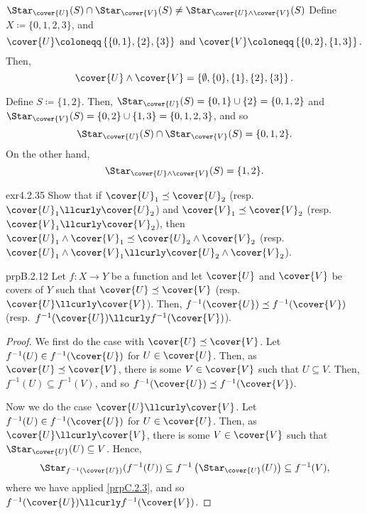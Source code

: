 \begin{exm}{$\Star _{\cover{U}}(S)\cap \Star _{\cover{V}}(S)\neq \Star _{\cover{U}\wedge \cover{V}}(S)$}{}
Define $X\coloneqq \{ 0,1,2,3\}$, and
\begin{equation*}
\cover{U}\coloneqq \left\{ \{ 0,1\} ,\{ 2\} ,\{ 3\} \right\} \text{ and }\cover{V}\coloneqq \left\{ \{ 0,2\} ,\{ 1,3\} \right\} .
\end{equation*}
Then,
\begin{equation}
\cover{U}\wedge \cover{V}=\left\{ \emptyset ,\{ 0\} ,\{ 1\} ,\{ 2\} ,\{ 3\} \right\} .
\end{equation}

Define $S\coloneqq \{ 1,2\}$.  Then, $\Star _{\cover{U}}(S)=\{ 0,1\} \cup \{ 2\} =\{ 0,1,2\}$ and $\Star _{\cover{V}}(S)=\{ 0,2\} \cup \{ 1,3\} =\{ 0,1,2,3\}$, and so
\begin{equation}
\Star _{\cover{U}}(S)\cap \Star _{\cover{V}}(S)=\{ 0,1,2\} .
\end{equation}
On the other hand,
\begin{equation}
\Star _{\cover{U}\wedge \cover{V}}(S)=\{ 1,2\} .
\end{equation}
\end{exm}
\begin{exr}{}{exr4.2.35}
Show that if $\cover{U}_1\preceq \cover{U}_2$ (resp.$\cover{U}_1\llcurly \cover{U}_2$) and $\cover{V}_1\preceq \cover{V}_2$ (resp.~$\cover{V}_1\llcurly \cover{V}_2$), then $\cover{U}_1\wedge \cover{V}_1\preceq \cover{U}_2\wedge \cover{V}_2$ (resp.~$\cover{U}_1\wedge \cover{V}_1\llcurly \cover{U}_2\wedge \cover{V}_2$).
\end{exr}
\begin{prp}{}{prpB.2.12}
Let $f\colon X\rightarrow Y$ be a function and let $\cover{U}$ and $\cover{V}$ be covers of $Y$ such that $\cover{U}\preceq \cover{V}$ (resp.~$\cover{U}\llcurly \cover{V}$).  Then, $f^{-1}(\cover{U})\preceq f^{-1}(\cover{V})$ (resp.~$f^{-1}(\cover{U})\llcurly f^{-1}(\cover{V})$).
\begin{proof}
We first do the case with $\cover{U}\preceq \cover{V}$.  Let $f^{-1}(U)\in f^{-1}(\cover{U})$ for $U\in \cover{U}$.  Then, as $\cover{U}\preceq \cover{V}$, there is some $V\in \cover{V}$ such that $U\subseteq V$.  Then, $f^{-1}(U)\subseteq f^{-1}(V)$, and so $f^{-1}(\cover{U})\preceq f^{-1}(\cover{V})$.

Now we do the case $\cover{U}\llcurly \cover{V}$.  Let $f^{-1}(U)\in f^{-1}(\cover{U})$ for $U\in \cover{U}$.  Then, as $\cover{U}\llcurly \cover{V}$, there is some $V\in \cover{V}$ such that $\Star _{\cover{U}}(U)\subseteq V$.  Hence,
\begin{equation}
\Star _{f^{-1}(\cover{U})}(f^{-1}(U))\subseteq f^{-1}\left( \Star _{\cover{U}}(U)\right) \subseteq f^{-1}(V),
\end{equation}
where we have applied \cref{prpC.2.3}, and so $f^{-1}(\cover{U})\llcurly f^{-1}(\cover{V})$.
\end{proof}
\end{prp}
